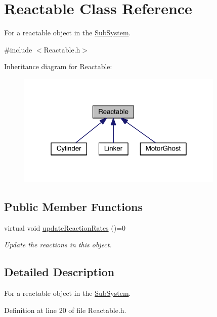 \hypertarget{classReactable}{\section{Reactable Class Reference}
\label{classReactable}
}


For a reactable object in the \hyperlink{classSubSystem}{Sub\+System}.  




{\ttfamily \#include $<$Reactable.\+h$>$}



Inheritance diagram for Reactable\+:\nopagebreak
\begin{figure}[H]
\begin{center}
\leavevmode
\includegraphics[width=280pt]{classReactable__inherit__graph}
\end{center}
\end{figure}
\subsection*{Public Member Functions}
\begin{DoxyCompactItemize}
\item 
virtual void \hyperlink{classReactable_a351e4c2d8891271c46fbbb0103b62619}{update\+Reaction\+Rates} ()=0
\begin{DoxyCompactList}\small\item\em Update the reactions in this object. \end{DoxyCompactList}\end{DoxyCompactItemize}


\subsection{Detailed Description}
For a reactable object in the \hyperlink{classSubSystem}{Sub\+System}. 

Definition at line 20 of file Reactable.\+h.



